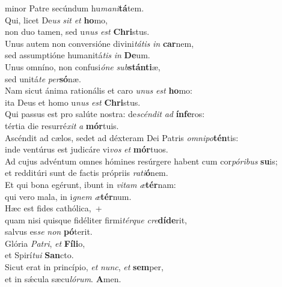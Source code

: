 \oddverse minor Patre secúndum hu\textit{ma}\textit{ni}\textbf{tá}tem.\\
\evenverse Qui, licet De\textit{us} \textit{sit} \textit{et} \textbf{ho}mo,~\*\\
\evenverse non duo tamen, sed u\textit{nus} \textit{est} \textbf{Chri}stus.\\
\oddverse Unus autem non conversióne divini\textit{tá}\textit{tis} \textit{in} \textbf{car}nem,~\*\\
\oddverse sed assumptióne humanitá\textit{tis} \textit{in} \textbf{De}um.\\
\evenverse Unus omníno, non confusi\textit{ó}\textit{ne} \textit{sub}\textbf{stán}\textbf{ti}æ,~\*\\
\evenverse sed unitá\textit{te} \textit{per}\textbf{só}næ.\\
\oddverse Nam sicut ánima rationális et caro \textit{u}\textit{nus} \textit{est} \textbf{ho}mo:~\*\\
\oddverse ita Deus et homo u\textit{nus} \textit{est} \textbf{Chri}stus.\\
\evenverse Qui passus est pro salúte nostra: de\textit{scén}\textit{dit} \textit{ad} \textbf{ín}\textbf{fe}ros:~\*\\
\evenverse tértia die resurré\textit{xit} \textit{a} \textbf{mór}tuis.\\
\oddverse Ascéndit ad cælos, sedet ad déxteram Dei Patris \textit{om}\textit{ni}\textit{po}\textbf{tén}tis:~\*\\
\oddverse inde ventúrus est judicáre vi\textit{vos} \textit{et} \textbf{mór}tuos.\\
\evenverse Ad cujus advéntum omnes hómines resúrgere habent cum cor\textit{pó}\textit{ri}\textit{bus} \textbf{su}is;~\*\\
\evenverse et redditúri sunt de factis própriis \textit{ra}\textit{ti}\textbf{ó}nem.\\
\oddverse Et qui bona egérunt, ibunt in \textit{vi}\textit{tam} \textit{æ}\textbf{tér}nam:~\*\\
\oddverse qui vero mala, in i\textit{gnem} \textit{æ}\textbf{tér}num.\\
\evenverse Hæc est fides cathólica,~+\\
\evenverse  quam nisi quisque fidéliter firmi\textit{tér}\textit{que} \textit{cre}\textbf{dí}\textbf{de}rit,~\*\\
\evenverse salvus es\textit{se} \textit{non} \textbf{pó}terit.\\
\oddverse Glória \textit{Pa}\textit{tri}, \textit{et} \textbf{Fí}\textbf{li}o,~\*\\
\oddverse et Spirí\textit{tu}\textit{i} \textbf{San}cto.\\
\evenverse Sicut erat in princípio, \textit{et} \textit{nunc}, \textit{et} \textbf{sem}per,~\*\\
\evenverse et in sǽcula sæcu\textit{ló}\textit{rum}. \textbf{A}men.\\
